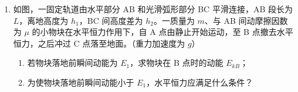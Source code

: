 \documentclass[\gkver]{gaokaozhenti}
\begin{document}
\begin{enumerate}
{$T^{2} = \frac{4\pi^{2}}{g}(l + r)$

$T^{2}-l$ 图像的斜率 $k = \frac{4\pi^{2}}{g}$。由图可知

$k = \frac{3.850 - 3.000}{(95.0 - 74.0) \times 10^{-2}}\ \mathrm{s^{2}/m} \approx 4.05\ \mathrm{s^{2}/m}$

所以 $g = \frac{4\pi^{2}}{k} \approx 9.75\Umsq$。

（3）应在摆球经过最低点时开始计时。摆球在最高点的速度为零，很难准确判断它到达最高点的时刻；在最低点摆球的速度最大，经过最低点的时刻容易判断准确，计时误差小。
}

\item
如图，一固定轨道由水平部分 AB 和光滑弧形部分 BC 平滑连接，AB 段长为 $L$，离地高度为 $h_{1}$，BC 间高度差为 $h_{2}$。一质量为 $m$、与 AB 间动摩擦因数为 $\mu$ 的小物块在水平恒力作用下，自 A 点由静止开始运动，至 B 点撤去水平恒力，之后冲过 C 点落至地面。（重力加速度为 $g$）
\begin{enumerate}
	\item
	若物块落地前瞬间动能为 $E_{1}$，求物块在 B 点时的动能 $E_{kB}$；
	\item
	为使物块落地前瞬间动能小于 $E_{1}$，水平恒力应满足什么条件？
\end{enumerate}
\onepicture[w=5.5cm, align=right]{}
\end{enumerate}
\end{document}
